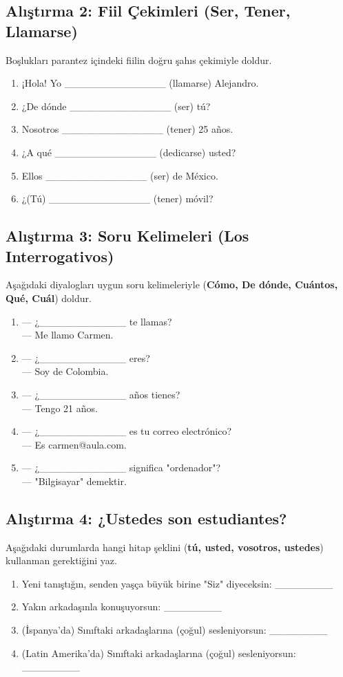 \documentclass[12pt,a4paper]{article}
\begin{document}
\subsection{Alıştırma 2: Fiil Çekimleri (Ser, Tener, Llamarse)}
Boşlukları parantez içindeki fiilin doğru şahıs çekimiyle doldur.
\begin{enumerate}
    \item ¡Hola! Yo \_\_\_\_\_\_\_\_\_\_\_\_\_\_ (llamarse) Alejandro.
    \item ¿De dónde \_\_\_\_\_\_\_\_\_\_\_\_\_\_ (ser) tú?
    \item Nosotros \_\_\_\_\_\_\_\_\_\_\_\_\_\_ (tener) 25 años.
    \item ¿A qué \_\_\_\_\_\_\_\_\_\_\_\_\_\_ (dedicarse) usted?
    \item Ellos \_\_\_\_\_\_\_\_\_\_\_\_\_\_ (ser) de México.
    \item ¿(Tú) \_\_\_\_\_\_\_\_\_\_\_\_\_\_ (tener) móvil?
\end{enumerate}

\subsection{Alıştırma 3: Soru Kelimeleri (Los Interrogativos)}
Aşağıdaki diyalogları uygun soru kelimeleriyle (\textbf{Cómo, De dónde, Cuántos, Qué, Cuál}) doldur.
\begin{enumerate}
    \item — ¿\_\_\_\_\_\_\_\_\_\_\_\_ te llamas? \\ — Me llamo Carmen.
    \item — ¿\_\_\_\_\_\_\_\_\_\_\_\_ eres? \\ — Soy de Colombia.
    \item — ¿\_\_\_\_\_\_\_\_\_\_\_\_ años tienes? \\ — Tengo 21 años.
    \item — ¿\_\_\_\_\_\_\_\_\_\_\_\_ es tu correo electrónico? \\ — Es carmen@aula.com.
    \item — ¿\_\_\_\_\_\_\_\_\_\_\_\_ significa "ordenador"? \\ — "Bilgisayar" demektir.
\end{enumerate}

\subsection{Alıştırma 4: ¿Ustedes son estudiantes?}
Aşağıdaki durumlarda hangi hitap şeklini (\textbf{tú, usted, vosotros, ustedes}) kullanman gerektiğini yaz.
\begin{enumerate}
    \item Yeni tanıştığın, senden yaşça büyük birine "Siz" diyeceksin: \_\_\_\_\_\_\_\_
    \item Yakın arkadaşınla konuşuyorsun: \_\_\_\_\_\_\_\_
    \item (İspanya'da) Sınıftaki arkadaşlarına (çoğul) sesleniyorsun: \_\_\_\_\_\_\_\_
    \item (Latin Amerika'da) Sınıftaki arkadaşlarına (çoğul) sesleniyorsun: \_\_\_\_\_\_\_\_
\end{enumerate}
\end{document}
